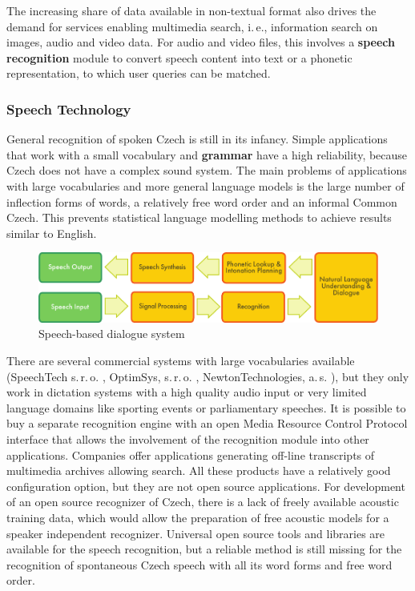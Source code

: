\begin{multicols}{2}
The increasing share of data available in non-textual format also drives the demand for services enabling multimedia search, i.\,e., information search on images, audio and video data. For audio and video files, this involves a \textbf{speech recognition} module to convert speech content into text or a phonetic representation, to which user queries can be matched.  
  
\subsubsection{Speech Technology}

General recognition of spoken Czech is still in its infancy. Simple applications that work with a small vocabulary and \textbf{grammar} have a high reliability, because Czech does not have a complex sound system. The main problems of applications with large vocabularies and more general language models is the large number of inflection forms of words, a relatively free word order and an informal Common Czech. This prevents statistical language modelling methods to achieve results similar to English.
 \begin{figure}[htb]
  \center
  \includegraphics[width=\textwidth]{../_media/english/simple_speech-based_dialogue_architecture}
  \caption{Speech-based dialogue system}
  \label{fig:dialoguearch_en}
\end{figure}
There are several commercial systems with large vocabularies available (SpeechTech s.\,r.\,o. \cite{Note11}, OptimSys, s.\,r.\,o. \cite{Note12}, NewtonTechnologies, a.\,s. \cite{Note13}), but they only work in dictation systems with a high quality audio input or very limited language domains like sporting events or parliamentary speeches. It is possible to buy a separate recognition engine with an open Media Resource Control Protocol  interface that allows the involvement of the recognition module into other applications. Companies offer applications generating off-line transcripts of multimedia archives allowing search. All these products have a relatively good configuration option, but they are not open source applications. For development of an open source recognizer of Czech, there is a lack of freely available acoustic training data, which would allow the preparation of free acoustic models for a speaker independent recognizer. Universal open source tools and libraries are available for the speech recognition, but a reliable method is still missing for the recognition of spontaneous Czech speech with all its word forms and free word order.

\end{multicols}

